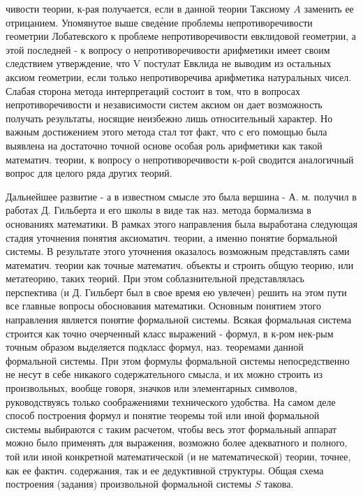 \documentclass[10pt]{article}
\begin{document}
чивости теории, к-рая получается, если в данной теории Таксиому $A$ заменить ее отрицанием. Упомянутое выше сведе́ние проблемы непротиворечивости геометрии Лобатевского к проблеме непротиворечивости евклидовой геометрии, а этой последней - к вопросу о непротиворечивости арифметики имеет своим следствием утверждение, что V постулат Евклида не выводим из остальных аксиом геометрии, если только непротиворечива арифметика натуральных чисел. Слабая сторона метода интерпретаций состоит в том, что в вопросах непротиворечивости и независимости систем аксиом он дает возможность получать результаты, носящие неизбежно лишь относительный характер. Но важным достижением этого метода стал тот факт, что с его помощью была выявлена на достаточно точной основе особая роль арифметики как такой математич. теории, к вопросу о непротиворечивости к-рой сводится аналогичный вопрос для целого ряда других теорий.



Дальнейшее развитие - а в известном смысле это была вершина - А. м. получил в работах Д. Гильберта и его школы в виде так наз. метода бормализма в основаниях математики. В рамках этого направления была выработана следующая стадия уточнения понятия аксиоматич. теории, а именно понятие бормальной системы. В результате этого уточнения оказалось возможным представлять сами математич. теории как точные математич. объекты и строить общую теорию, или метатеорию, таких теорий. При этом соблазнительной представлялась перспектива (и Д. Гильберт был в свое время ею увлечен) решить на этом пути все главные вопросы обоснования математики. Основным понятием этого направления является понятие формальной системы. Всякая формальная система строится как точно очерченный класс выражений - формул, в к-ром нек-рым точным образом выделяется подкласс формул, наз. теоремами данной формальной системы. При этом формулы формальной системы непосредственно не несут в себе никакого содержательного смысла, и их можно строить из произвольных, вообще говоря, значков или элементарных символов, руководствуясь только соображениями технического удобства. На самом деле способ построения формул и понятие теоремы той или иной формальной системы выбираются с таким расчетом, чтобы весь этот формальный аппарат можно было применять для выражения, возможно более адекватного и полного, той или иной конкретной математической (и не математической) теории, точнее, как ее фактич. содержания, так и ее дедуктивной структуры. Общая схема построения (задания) произвольной формальной системы $S$ такова.
\end{document}
